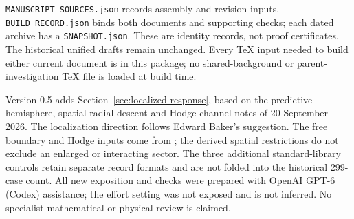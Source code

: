 \nolinkurl{MANUSCRIPT_SOURCES.json} records assembly and revision
inputs. \nolinkurl{BUILD_RECORD.json} binds both documents and
supporting checks; each dated archive has a
\nolinkurl{SNAPSHOT.json}. These are identity records, not proof
certificates. The historical unified drafts remain unchanged.
Every TeX input needed to build either current document is in this
package; no shared-background or parent-investigation TeX file is
loaded at build time.

Version 0.5 adds Section~\ref{sec:localized-response}, based on the
predictive hemisphere, spatial radial-descent and Hodge-channel
notes of 20 September 2026. The localization direction follows
Edward Baker's suggestion. The free boundary and Hodge inputs come
from \cite{DPYHiggs,DedushenkoGluing}; the derived spatial restrictions
do not exclude an enlarged or interacting sector. The three
additional standard-library controls retain separate record formats
and are not folded into the historical 299-case count.
All new exposition and checks were prepared with OpenAI GPT-6
(Codex) assistance; the effort setting was not exposed and is not
inferred. No specialist mathematical or physical review is claimed.
